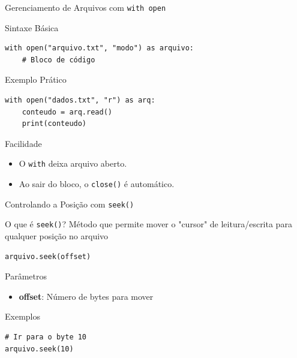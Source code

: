 \begin{frame}[fragile]{Gerenciamento de Arquivos com \texttt{with open}}
    \begin{block}{Sintaxe Básica}
        \begin{verbatim}
with open("arquivo.txt", "modo") as arquivo:
    # Bloco de código
        \end{verbatim}
    \end{block}

    \begin{exampleblock}{Exemplo Prático}
        \begin{verbatim}
with open("dados.txt", "r") as arq:
    conteudo = arq.read()
    print(conteudo)
                \end{verbatim}
    \end{exampleblock}


    \begin{block}{Facilidade}
        \begin{itemize}
            \item O \texttt{with} deixa arquivo aberto.
            \item Ao sair do bloco, o \texttt{close()} é  automático.
        \end{itemize}

    \end{block}
\end{frame}

\begin{frame}[fragile]{Controlando a Posição com \texttt{seek()}}

    \begin{block}{O que é \texttt{seek()}?}
        Método que permite mover o "cursor" de leitura/escrita para qualquer posição no arquivo
        \begin{verbatim}
arquivo.seek(offset)
        \end{verbatim}
    \end{block}


    \begin{alertblock}{Parâmetros}
        \begin{itemize}
            \item \textbf{offset}: Número de bytes para mover

        \end{itemize}
    \end{alertblock}

    \begin{exampleblock}{Exemplos}
        \begin{verbatim}
# Ir para o byte 10
arquivo.seek(10)
                \end{verbatim}
    \end{exampleblock}
\end{frame}

